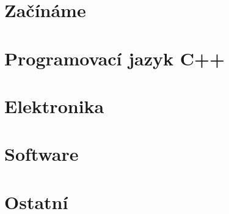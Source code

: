 \documentclass[12pt]{report} %
\begin{document}


\tableofcontents %

\chapter{Začínáme}
	
	

\chapter{Programovací jazyk C++}
	
	
	

\chapter{Elektronika}
	
	
	
	
	
\chapter{Software}
	
 
\chapter{Ostatní}
	
	
	

\printindex %
\end{document}
